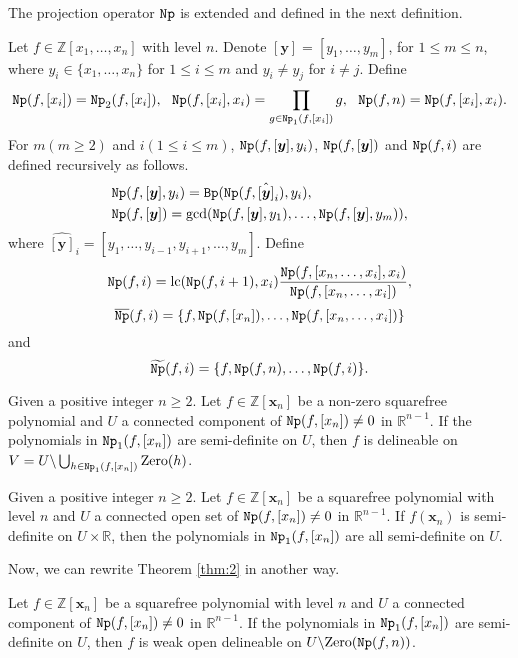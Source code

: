 \documentclass[amsthm]{elsart}
\def \lc  {{\rm lc}}
\def \Bproj  {{\tt Bp}}
\def  \zero {{\rm Zero}}
\def  \Nproj {{\tt Np}}
\def \RR {{\mathbb R}}
\def \ZZ {{\mathbb Z}}
\newcommand{\xx}{\bm{x}}
\newcommand{\yy}{\bm{y}}
\begin{document}
The projection operator $\Nproj$ is extended and defined in the next definition.
\begin{defn}
        Let $f\in \ZZ[x_1,\dots,x_n]$ with level $n$. Denote $[\yy]=[y_1,\dots,y_{m}]$, for $1\le m\le n$, where $ y_i \in \{x_1,\dots,x_n\}$ for $1\le i\le m$ and $y_i\neq y_j$ for $i\neq j$. Define
 \[\Nproj(f,[x_i])=\Nproj_2(f,[x_i]),~~ \Nproj(f,[x_i],x_i)=\prod_{g\in\Nproj_1(f,[x_i])}{g}, ~~ \Nproj(f,n)=\Nproj(f,[x_i],x_i).\]
 For $m (m\ge2)$ and $i (1\le i \le m)$, $\Nproj(f,[\yy],y_i)$, $\Nproj(f,[\yy])$ and $\Nproj(f,i)$ are defined recursively as follows.
        \begin{align*}
&\Nproj(f,[\yy],y_i)=\Bproj(\Nproj(f,\hat{[\yy]}_i),y_i), \\
&\Nproj(f,[\yy])=\gcd(\Nproj(f,[\yy],y_1),\ldots,\Nproj(f,[\yy],y_m)),
\end{align*}
where $\hat{[\yy]}_i=[y_1,\ldots,y_{i-1},y_{i+1},\ldots,y_m]$. Define
$$\Nproj(f,i)=\lc(\Nproj(f,i+1),x_i)\frac{\Nproj(f,[x_n,\ldots,x_i],x_i)}{\Nproj(f,[x_n,\ldots,x_i])},$$
\[\overline{\Nproj}(f,i)=\{f,\Nproj(f,[x_{n}]), \ldots, \Nproj(f,[x_{n},\ldots,x_i])\}\] and
\[\widetilde{\Nproj}(f,i)=\{f,\Nproj(f,n),\ldots,\Nproj(f,i)\}.\]
\end{defn}
\begin{thm}\label{thm:2} \citep{han2016proving}
        Given a positive integer $n\ge2$. Let $f\in \ZZ[\xx_n]$ be a non-zero squarefree polynomial and $U$ a connected component of $\Nproj(f,[x_{n}])\neq0$ in $\RR^{n-1}$. If the polynomials in $\Nproj_{1}(f,[x_n])$ are semi-definite on $U$, then $f$ is delineable on $V=U\backslash \bigcup_{h\in \Nproj_{1}(f,[x_n])}\zero(h)$.
\end{thm}
\begin{lem} \label{prop:han2016proving} \citep{han2016proving}
        Given a positive integer $n\ge2$. Let $f\in\ZZ[\xx_{n}]$ be a squarefree polynomial with level $n$ and $U$ a connected open set of $\Nproj(f,[x_{n}])\neq0$ in $\RR^{n-1}$. If $f(\xx_n)$ is semi-definite on $U\times \RR$, then the polynomials in $\Nproj_{1}(f,[x_n])$ are all semi-definite on $U$.
\end{lem}
Now, we can rewrite Theorem \ref{thm:2} in another way. \begin{prop}\label{pr:6}
        Let $f\in\ZZ[\xx_{n}]$ be a squarefree polynomial with level $n$ and $U$ a connected component of $\Nproj(f,[x_{n}])\neq0$ in $\RR^{n-1}$. If the polynomials in $\Nproj_{1}(f,[x_n])$ are semi-definite on $U$, then $f$ is weak open delineable on $U\backslash\zero({\Nproj}(f,n))$.
\end{prop}
\end{document}
